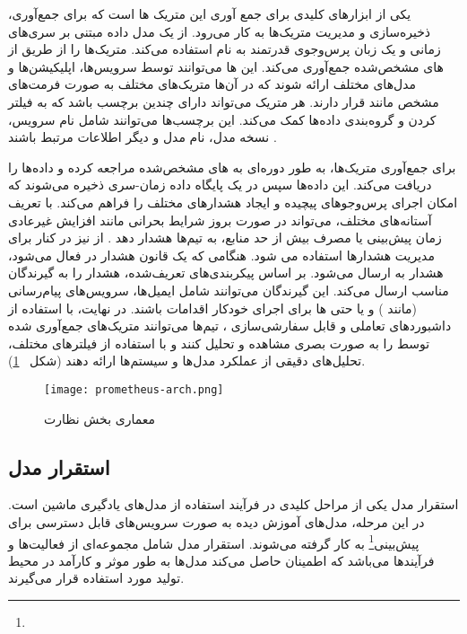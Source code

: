  یکی از ابزارهای کلیدی برای جمع آوری این متریک ها  است که برای جمع‌آوری، ذخیره‌سازی و مدیریت متریک‌ها به کار می‌رود.  از یک مدل داده مبتنی بر سری‌های زمانی و یک زبان پرس‌وجوی قدرتمند به نام  استفاده می‌کند.  متریک‌ها را از طریق  از های مشخص‌شده جمع‌آوری می‌کند. این ها می‌توانند توسط سرویس‌ها، اپلیکیشن‌ها و مدل‌های مختلف ارائه شوند که در آن‌ها متریک‌های مختلف به صورت فرمت‌های مشخص مانند  قرار دارند. هر متریک می‌تواند دارای چندین برچسب باشد که به فیلتر کردن و گروه‌بندی داده‌ها کمک می‌کند. این برچسب‌ها می‌توانند شامل نام سرویس، نسخه مدل، نام مدل و دیگر اطلاعات مرتبط باشند \cite{Prometheus1}.
 
 برای جمع‌آوری متریک‌ها،  به طور دوره‌ای به های مشخص‌شده مراجعه کرده و داده‌ها را دریافت می‌کند. این داده‌ها سپس در یک پایگاه داده زمان-سری ذخیره می‌شوند که امکان اجرای پرس‌وجوهای پیچیده و ایجاد هشدارهای مختلف را فراهم می‌کند. با تعریف آستانه‌های مختلف،  می‌تواند در صورت بروز شرایط بحرانی مانند افزایش غیرعادی زمان پیش‌بینی یا مصرف بیش از حد منابع، به تیم‌ها هشدار دهد \cite{Prometheus1}. از  نیز در کنار  برای مدیریت هشدارها استفاده می شود. هنگامی که یک قانون هشدار در  فعال می‌شود، هشدار به  ارسال می‌شود.  بر اساس پیکربندی‌های تعریف‌شده، هشدار را به گیرندگان مناسب ارسال می‌کند. این گیرندگان می‌توانند شامل ایمیل‌ها، سرویس‌های پیام‌رسانی (مانند ) و یا حتی ‌ها برای اجرای خودکار اقدامات باشند. در نهایت، با استفاده از داشبوردهای تعاملی و قابل سفارشی‌سازی ، تیم‌ها می‌توانند متریک‌های جمع‌آوری شده توسط  را به صورت بصری مشاهده و تحلیل کنند و با استفاده از فیلترهای مختلف، تحلیل‌های دقیقی از عملکرد مدل‌ها و سیستم‌ها ارائه دهند \cite{Grafana} (شکل ~\ref{fig: monitoring arch}).

\begin{figure}[!t]
	\centering
	\texttt{[image: prometheus-arch.png]}
	\caption{معماری بخش نظارت}
	\label{fig: monitoring arch}
\end{figure} 
 
\subsection{استقرار مدل}

استقرار مدل یکی از مراحل کلیدی در فرآیند استفاده از مدل‌های یادگیری ماشین است. در این مرحله، مدل‌های آموزش دیده به صورت سرویس‌های قابل دسترسی برای پیش‌بینی\footnote{} به کار گرفته می‌شوند. استقرار مدل شامل مجموعه‌ای از فعالیت‌ها و فرآیندها می‌باشد که اطمینان حاصل می‌کند مدل‌ها به طور موثر و کارآمد در محیط تولید مورد استفاده قرار می‌گیرند. 

